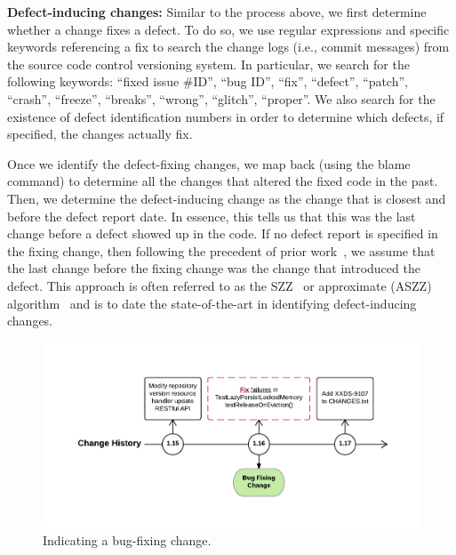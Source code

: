 \noindent\textbf{Defect-inducing changes:} Similar to the process above, we first determine whether a change fixes a defect. To do so, we use regular expressions and specific keywords referencing a fix to search the change logs (i.e., commit messages) from the source code control versioning system. In particular, we search for the following keywords: ``fixed issue \#ID'', ``bug ID'',  ``fix'',  ``defect'',  ``patch'', ``crash'',  ``freeze'', ``breaks'', ``wrong'', ``glitch'', ``proper''. We also search for the existence of defect identification numbers in order to determine which defects, if specified, the changes actually fix.

Once we identify the defect-fixing changes, we map back (using the blame command) to determine all the changes that altered the fixed code in the past. Then, we determine the defect-inducing change as the change that is closest and before the defect report date. In essence, this tells us that this was the last change before a defect showed up in the code. If no defect report is specified in the fixing change, then following the precedent of prior work~\cite{Kamei-tse-2013}, we assume that the last change before the fixing change was the change that introduced the defect. This approach is often referred to as the SZZ~\cite{sliwerski-msr-2005} or approximate (ASZZ) algorithm~\cite{Kamei-tse-2013} and is to date the state-of-the-art in identifying defect-inducing changes.


\begin{figure}[h]
	\centering
	\includegraphics[width=150mm]{figures/chapter3/bug-fixing-change}
	\caption{Indicating a bug-fixing change.}
	\label{fig:indicating-a-bug-fixing-change}
\end{figure}


